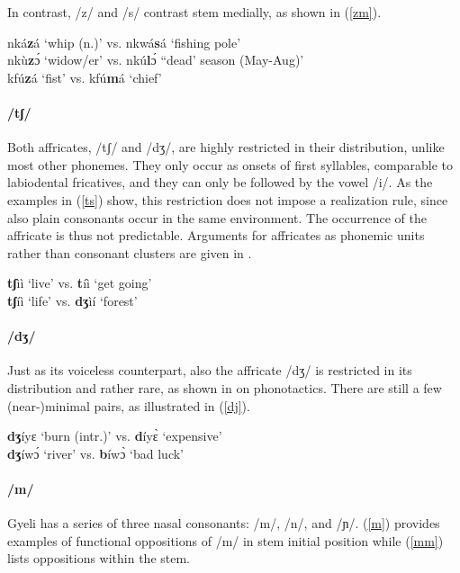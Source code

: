 \noindent In contrast, /z/ and /s/ contrast stem medially, as shown in (\ref{zm}).

\begin{exe} \ex \label{zm}
nká{\bfseries z}á `whip (n.)' vs. nkwá{\bfseries s}á `fishing pole' \\
nkù{\bfseries z}ɔ́ `widow/er' vs. nkú{\bfseries l}ɔ́ ``dead' season (May-Aug)' \\
kfú{\bfseries z}á `fist' vs. kfú{\bfseries m}á `chief'
\end{exe}

\paragraph{\bfseries /tʃ/} Both affricates, /tʃ/ and /dʒ/, are highly restricted in their distribution, unlike most other phonemes. They only occur as onsets of first syllables, comparable to labiodental fricatives, and they can only be followed by the vowel /i/. As the examples in (\ref{ts}) show, this restriction does not impose a realization rule, since also plain consonants occur in the same environment. The occurrence of the affricate is thus not predictable. Arguments for affricates as phonemic units rather than consonant clusters are given in . 

\begin{exe} \ex \label{ts}
{\bfseries tʃ}ìì `live' vs. {\bfseries t}íì `get going' \\
{\bfseries tʃ}íì `life' vs. {\bfseries dʒ}ìí `forest'
\end{exe}


\paragraph{\bfseries /dʒ/}   Just as its voiceless counterpart, also the affricate /dʒ/ is restricted in its distribution and rather rare, as shown in  on phonotactics. There are still a few (near-)minimal pairs, as illustrated in (\ref{dj}).

\begin{exe} \ex \label{dj}
{\bfseries dʒ}íyɛ `burn (intr.)' vs. {\bfseries d}íyɛ̀ `expensive' \\
{\bfseries dʒ}íwɔ́ `river' vs. {\bfseries b}íwɔ̀ `bad luck' 
\end{exe}

\paragraph{\bfseries /m/} Gyeli has a series of three nasal consonants: /m/, /n/, and /ɲ/. (\ref{m}) provides examples of functional oppositions of /m/ in stem initial position while (\ref{mm}) lists oppositions within the stem.

